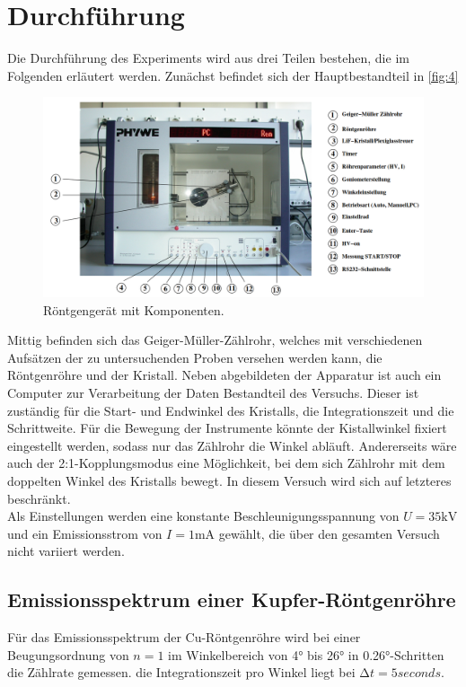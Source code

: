 \section{Durchführung}
\label{sec:Durchführung}

Die Durchführung des Experiments wird aus drei Teilen bestehen, die im Folgenden 
erläutert werden. Zunächst befindet sich der Hauptbestandteil in \autoref{fig:4} 
\begin{figure}[H]
    \centering
        \centering
        \includegraphics[width=\textwidth]{bilder/roehre.png}
        \caption{Röntgengerät mit Komponenten. \cite{anleitung10}}
    \hfill
    \label{fig:4}
\end{figure}
\noindent Mittig befinden sich das Geiger-Müller-Zählrohr, welches mit verschiedenen 
Aufsätzen der zu untersuchenden Proben versehen werden kann, die Röntgenröhre und 
der Kristall. Neben abgebildeten der Apparatur ist auch ein Computer zur
Verarbeitung der Daten Bestandteil des Versuchs. Dieser ist zuständig für die
Start- und Endwinkel des Kristalls, die Integrationszeit und die Schrittweite.
Für die Bewegung der Instrumente könnte der Kistallwinkel fixiert eingestellt 
werden, sodass nur das Zählrohr die Winkel abläuft. Andererseits wäre auch der 
2:1-Kopplungsmodus eine Möglichkeit, bei dem sich Zählrohr mit dem doppelten 
Winkel des Kristalls bewegt. In diesem Versuch wird sich auf letzteres beschränkt. 
\vspace{0.5em}
\\
\noindent Als Einstellungen werden eine konstante Beschleunigungsspannung von 
$U = 35 \unit{\kilo\volt}$ und ein Emissionsstrom von $I = 1 \unit{\milli\ampere}$
gewählt, die über den gesamten Versuch nicht variiert werden.

\subsection{Emissionsspektrum einer Kupfer-Röntgenröhre}
Für das Emissionsspektrum der Cu-Röntgenröhre wird bei einer Beugungsordnung von 
$n = 1$ im Winkelbereich von 4° bis 26° in 0.26°-Schritten die Zählrate gemessen.
die Integrationszeit pro Winkel liegt bei $\increment t = 5 \unit{seconds}$.

